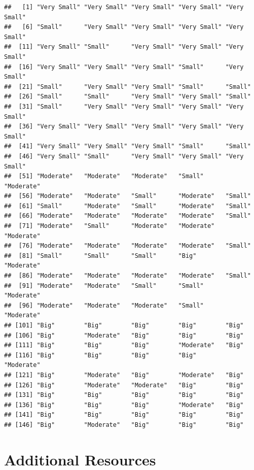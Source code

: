 \documentclass[
]{book}
\begin{document}
\begin{verbatim}
##   [1] "Very Small" "Very Small" "Very Small" "Very Small" "Very Small"
##   [6] "Small"      "Very Small" "Very Small" "Very Small" "Very Small"
##  [11] "Very Small" "Small"      "Very Small" "Very Small" "Very Small"
##  [16] "Very Small" "Very Small" "Very Small" "Small"      "Very Small"
##  [21] "Small"      "Very Small" "Very Small" "Small"      "Small"     
##  [26] "Small"      "Small"      "Very Small" "Very Small" "Small"     
##  [31] "Small"      "Very Small" "Very Small" "Very Small" "Very Small"
##  [36] "Very Small" "Very Small" "Very Small" "Very Small" "Very Small"
##  [41] "Very Small" "Very Small" "Very Small" "Small"      "Small"     
##  [46] "Very Small" "Small"      "Very Small" "Very Small" "Very Small"
##  [51] "Moderate"   "Moderate"   "Moderate"   "Small"      "Moderate"  
##  [56] "Moderate"   "Moderate"   "Small"      "Moderate"   "Small"     
##  [61] "Small"      "Moderate"   "Small"      "Moderate"   "Small"     
##  [66] "Moderate"   "Moderate"   "Moderate"   "Moderate"   "Small"     
##  [71] "Moderate"   "Small"      "Moderate"   "Moderate"   "Moderate"  
##  [76] "Moderate"   "Moderate"   "Moderate"   "Moderate"   "Small"     
##  [81] "Small"      "Small"      "Small"      "Big"        "Moderate"  
##  [86] "Moderate"   "Moderate"   "Moderate"   "Moderate"   "Small"     
##  [91] "Moderate"   "Moderate"   "Small"      "Small"      "Moderate"  
##  [96] "Moderate"   "Moderate"   "Moderate"   "Small"      "Moderate"  
## [101] "Big"        "Big"        "Big"        "Big"        "Big"       
## [106] "Big"        "Moderate"   "Big"        "Big"        "Big"       
## [111] "Big"        "Big"        "Big"        "Moderate"   "Big"       
## [116] "Big"        "Big"        "Big"        "Big"        "Moderate"  
## [121] "Big"        "Moderate"   "Big"        "Moderate"   "Big"       
## [126] "Big"        "Moderate"   "Moderate"   "Big"        "Big"       
## [131] "Big"        "Big"        "Big"        "Big"        "Big"       
## [136] "Big"        "Big"        "Big"        "Moderate"   "Big"       
## [141] "Big"        "Big"        "Big"        "Big"        "Big"       
## [146] "Big"        "Moderate"   "Big"        "Big"        "Big"
\end{verbatim}

\hypertarget{additional-resources-5}{%
\section*{Additional Resources}\label{additional-resources-5}}
\end{document}
